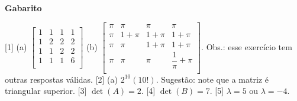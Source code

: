 \documentclass[12pt,a4paper]{article}
\begin{document}
\begin{center}
  \textbf{Gabarito}
\end{center}

[1] 
(a) $\begin{bmatrix}
		1 & 1 & 1 & 1 \\
		1 & 2 & 2 & 2 \\
		1 & 1 & 2 & 2 \\
		1 & 1 & 1 & 6 \\
	\end{bmatrix}$ 
(b) $\begin{bmatrix}
		\pi & \pi & \pi & \pi \\
		\pi & 1 + \pi & 1 + \pi & 1 + \pi \\
		\pi & \pi & 1 + \pi & 1 + \pi \\
		\pi & \pi & \pi & \dfrac{1}{\pi} + \pi \\
	\end{bmatrix}$. 
Obs.: esse exercício tem outras respostas válidas.  
[2] (a) $2^{10}(10!)$. Sugestão: note que a matriz é triangular superior. 
[3] $\det(A) = 2$. 
[4] $\det(B) = 7$. 
[5] $\lambda = 5$ ou $\lambda = -4$. 
\end{document}
